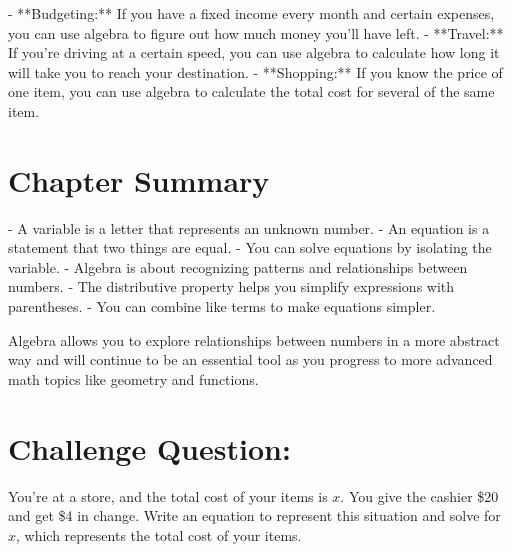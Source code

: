 - **Budgeting:** If you have a fixed income every month and certain expenses, you can use algebra to figure out how much money you'll have left.
- **Travel:** If you're driving at a certain speed, you can use algebra to calculate how long it will take you to reach your destination.
- **Shopping:** If you know the price of one item, you can use algebra to calculate the total cost for several of the same item.

\section{Chapter Summary}
- A variable is a letter that represents an unknown number.
- An equation is a statement that two things are equal.
- You can solve equations by isolating the variable.
- Algebra is about recognizing patterns and relationships between numbers.
- The distributive property helps you simplify expressions with parentheses.
- You can combine like terms to make equations simpler.

Algebra allows you to explore relationships between numbers in a more abstract way and will continue to be an essential tool as you progress to more advanced math topics like geometry and functions.

\section*{Challenge Question:}
You’re at a store, and the total cost of your items is $x$. You give the cashier \$20 and get \$4 in change. Write an equation to represent this situation and solve for $x$, which represents the total cost of your items.

